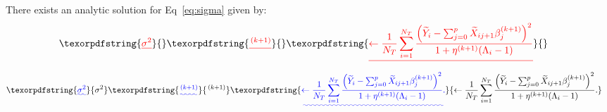 \documentclass[10pt,letterpaper]{article}
\newcommand{\Xtilde}{\widetilde{X}}
\newcommand{\Ytilde}{\widetilde{Y}}
\newcommand{\bTheta}{\boldsymbol{\Theta}}
\providecommand{\DIFaddtex}[1]{{\protect\color{blue}\uwave{#1}}} %
\providecommand{\DIFdeltex}[1]{{\protect\color{red}\sout{#1}}}                      %
\providecommand{\DIFaddbegin}{} %
\providecommand{\DIFaddend}{} %
\providecommand{\DIFdelbegin}{} %
\providecommand{\DIFdelend}{} %
\providecommand{\DIFadd}[1]{\texorpdfstring{\DIFaddtex{#1}}{#1}} %
\providecommand{\DIFdel}[1]{\texorpdfstring{\DIFdeltex{#1}}{}} %
\newcommand{\DIFscaledelfig}{0.5}
\newlength{\DIFdelgraphicswidth} %
\newlength{\DIFdelgraphicsheight} %
\newcommand{\DIFaddincludegraphics}[2][]{{\color{blue}\fbox{\DIFOincludegraphics[#1]{#2}}}} %
\newcommand{\DIFdelincludegraphics}[2][]{%
\sbox{\DIFdelgraphicsbox}{\DIFOincludegraphics[#1]{#2}}%
\settoboxwidth{\DIFdelgraphicswidth}{\DIFdelgraphicsbox} %
\settoboxtotalheight{\DIFdelgraphicsheight}{\DIFdelgraphicsbox} %
\scalebox{\DIFscaledelfig}{%
\parbox[b]{\DIFdelgraphicswidth}{\usebox{\DIFdelgraphicsbox}\\[-\baselineskip] \rule{\DIFdelgraphicswidth}{0em}}\llap{\resizebox{\DIFdelgraphicswidth}{\DIFdelgraphicsheight}{%
\setlength{\unitlength}{\DIFdelgraphicswidth}%
\begin{picture}(1,1)%
\thicklines\linethickness{2pt} %
{\color[rgb]{1,0,0}\put(0,0){\framebox(1,1){}}}%
{\color[rgb]{1,0,0}\put(0,0){\line( 1,1){1}}}%
{\color[rgb]{1,0,0}\put(0,1){\line(1,-1){1}}}%
\end{picture}%
}\hspace*{3pt}}} %
} %
\DeclareRobustCommand{\DIFaddbegin}{\DIFOaddbegin \let\includegraphics\DIFaddincludegraphics} %
\DeclareRobustCommand{\DIFaddend}{\DIFOaddend \let\includegraphics\DIFOincludegraphics} %
\DeclareRobustCommand{\DIFdelbegin}{\DIFOdelbegin \let\includegraphics\DIFdelincludegraphics} %
\DeclareRobustCommand{\DIFdelend}{\DIFOaddend \let\includegraphics\DIFOincludegraphics} %
\begin{document}
There exists an analytic solution for Eq~\ref{eq:sigma} given by:
\DIFdelbegin \begin{align*}
{\DIFdel{\sigma^2}}\DIFdel{^{\,(k+1)} }& \DIFdel{\gets \frac{1}{N_T}\sum_{i=1}^{N_T}\frac{\left(  \Ytilde_i - \sum_{j=0}^{p}\Xtilde_{ij+1}\beta_j^{(k+1)} \right) ^2}{1 + \eta^{(k+1)} (\Lambda_i-1)} %
}\end{align*}%
\DIFdelend \DIFaddbegin \begin{align*}
{\DIFadd{\sigma^2}}\DIFadd{^{\,(k+1)} }& \DIFadd{\gets \frac{1}{N_T}\sum_{i=1}^{N_T}\frac{\left(  \Ytilde_i - \sum_{j=0}^{p}\Xtilde_{ij+1}\beta_j^{(k+1)} \right) ^2}{1 + \eta^{(k+1)} (\Lambda_i-1)} \label{eq:sigmahat2}.
}\end{align*}\DIFaddend 
\end{document}
